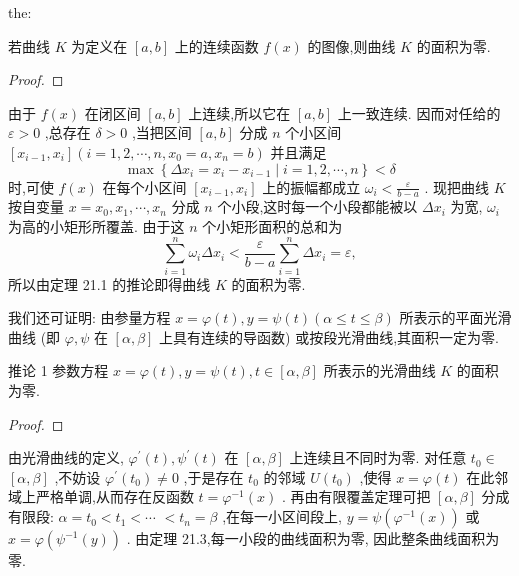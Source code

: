 \begin{theorem}{}{the:}

\end{theorem}
 若曲线 \(K\) 为定义在 \(\left\lbrack  {a,b}\right\rbrack\) 上的连续函数 \(f\left( x\right)\) 的图像,则曲线 \(K\) 的面积为零.

\begin{proof}

\end{proof}
由于 \(f\left( x\right)\) 在闭区间 \(\left\lbrack  {a,b}\right\rbrack\) 上连续,所以它在 \(\left\lbrack  {a,b}\right\rbrack\) 上一致连续. 因而对任给的 \(\varepsilon  > 0\) ,总存在 \(\delta  > 0\) ,当把区间 \(\left\lbrack  {a,b}\right\rbrack\) 分成 \(n\) 个小区间 \(\left\lbrack  {{x}_{i - 1},{x}_{i}}\right\rbrack  \left( {i = 1,2,\cdots ,n,{x}_{0} = a,{x}_{n} = b}\right)\) 并且满足
\[
\max \left\{  {\Delta {x}_{i} = {x}_{i} - {x}_{i - 1} \mid  i = 1,2,\cdots ,n}\right\}   < \delta
\]
时,可使 \(f\left( x\right)\) 在每个小区间 \(\left\lbrack  {{x}_{i - 1},{x}_{i}}\right\rbrack\) 上的振幅都成立 \({\omega }_{i} < \frac{\varepsilon }{b - a}\) . 现把曲线 \(K\) 按自变量 \(x ={x}_{0},{x}_{1},\cdots ,{x}_{n}\) 分成 \(n\) 个小段,这时每一个小段都能被以 \(\Delta {x}_{i}\) 为宽, \({\omega }_{i}\) 为高的小矩形所覆盖. 由于这 \(n\) 个小矩形面积的总和为
\[
\mathop{\sum }\limits_{{i = 1}}^{n}{\omega }_{i}\Delta {x}_{i} < \frac{\varepsilon }{b - a}\mathop{\sum }\limits_{{i = 1}}^{n}\Delta {x}_{i} = \varepsilon ,
\]
所以由定理 21.1 的推论即得曲线 \(K\) 的面积为零.

我们还可证明: 由参量方程 \(x = \varphi \left( t\right) ,y = \psi \left( t\right) \left( {\alpha  \leq  t \leq  \beta }\right)\) 所表示的平面光滑曲线 (即 \(\varphi ,\psi\) 在 \(\left\lbrack  {\alpha ,\beta }\right\rbrack\) 上具有连续的导函数) 或按段光滑曲线,其面积一定为零.

推论 1 参数方程 \(x = \varphi \left( t\right) ,y = \psi \left( t\right) ,t \in  \left\lbrack  {\alpha ,\beta }\right\rbrack\) 所表示的光滑曲线 \(K\) 的面积为零.

\begin{proof}

\end{proof}
由光滑曲线的定义, \({\varphi }^{\prime }\left( t\right) ,{\psi }^{\prime }\left( t\right)\) 在 \(\left\lbrack  {\alpha ,\beta }\right\rbrack\) 上连续且不同时为零. 对任意 \({t}_{0} \in\)  \(\left\lbrack  {\alpha ,\beta }\right\rbrack\) ,不妨设 \({\varphi }^{\prime }\left( {t}_{0}\right)  \neq  0\) ,于是存在 \({t}_{0}\) 的邻域 \(U\left( {t}_{0}\right)\) ,使得 \(x = \varphi \left( t\right)\) 在此邻域上严格单调,从而存在反函数 \(t = {\varphi }^{-1}\left( x\right)\) . 再由有限覆盖定理可把 \(\left\lbrack  {\alpha ,\beta }\right\rbrack\) 分成有限段: \(\alpha  = {t}_{0} < {t}_{1} < \cdots\)  \(< {t}_{n} = \beta\) ,在每一小区间段上, \(y = \psi \left( {{\varphi }^{-1}\left( x\right) }\right)\) 或 \(x = \varphi \left( {{\psi }^{-1}\left( y\right) }\right)\) . 由定理 21.3,每一小段的曲线面积为零, 因此整条曲线面积为零.

